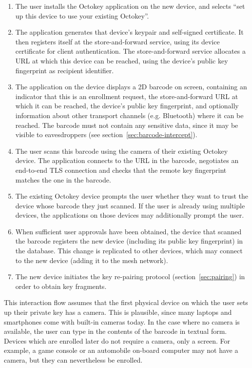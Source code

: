 \begin{enumerate}
\item The user installs the Octokey application on the new device, and selects ``set up this device
to use your existing Octokey''.
\item The application generates that device's keypair and self-signed certificate. It then registers
itself at the store-and-forward service, using its device certificate for client authentication. The
store-and-forward service allocates a URL at which this device can be reached, using the device's
public key fingerprint as recipient identifier.
\item The application on the device displays a 2D barcode on screen, containing an indicator that
this is an enrollment request, the store-and-forward URL at which it can be reached, the device's
public key fingerprint, and optionally information about other transport channels (e.g. Bluetooth)
where it can be reached. The barcode must not contain any sensitive data, since it may be visible to
eavesdroppers (see section~\ref{sec:barcode-intercept}).
\item The user scans this barcode using the camera of their existing Octokey device. The application
connects to the URL in the barcode, negotiates an end-to-end TLS connection and checks that the
remote key fingerprint matches the one in the barcode.
\item The existing Octokey device prompts the user whether they want to trust the device whose
barcode they just scanned. If the user is already using multiple devices, the applications on those
devices may additionally prompt the user.
\item When sufficient user approvals have been obtained, the device that scanned the barcode
registers the new device (including its public key fingerprint) in the database. This change is
replicated to other devices, which may connect to the new device (adding it to the mesh network).
\item The new device initiates the key re-pairing protocol (section~\ref{sec:pairing}) in order to
obtain key fragments.
\end{enumerate}

This interaction flow assumes that the first physical device on which the user sets up their private
key has a camera. This is plausible, since many laptops and smartphones come with built-in cameras
today. In the case where no camera is available, the user can type in the contents of the barcode in
textual form. Devices which are enrolled later do not require a camera, only a screen. For example,
a game console or an automobile on-board computer may not have a camera, but they can nevertheless
be enrolled.

